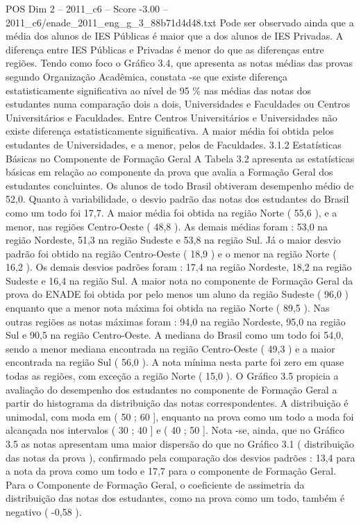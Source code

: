 \begin{textsample}{POS Dim 2 – 2011\_c6 – Score -3.00 – 2011\_c6/enade\_2011\_eng\_g\_3\_88b71d4d48.txt}
Pode ser observado ainda que a média dos alunos de IES Públicas é maior que a dos alunos de IES Privadas.
A diferença entre IES Públicas e Privadas é menor do que as diferenças entre regiões.
Tendo como foco o Gráfico 3.4, que apresenta as notas médias das provas segundo Organização Acadêmica, constata -se que existe diferença estatisticamente significativa ao nível de 95 \% nas médias das notas dos estudantes numa comparação dois a dois, Universidades e Faculdades ou Centros Universitários e Faculdades.
Entre Centros Universitários e Universidades não existe diferença estatisticamente significativa.
A maior média foi obtida pelos estudantes de Universidades, e a menor, pelos de Faculdades. 3.1.2 Estatísticas Básicas no Componente de Formação Geral A Tabela 3.2 apresenta as estatísticas básicas em relação ao componente da prova que avalia a Formação Geral dos estudantes concluintes.
Os alunos de todo Brasil obtiveram desempenho médio de 52,0.
Quanto à variabilidade, o desvio padrão das notas dos estudantes do Brasil como um todo foi 17,7.
A maior média foi obtida na região Norte ( 55,6 ), e a menor, nas regiões Centro-Oeste ( 48,8 ).
As demais médias foram : 53,0 na região Nordeste, 51,3 na região Sudeste e 53,8 na região Sul.
Já o maior desvio padrão foi obtido na região Centro-Oeste ( 18,9 ) e o menor na região Norte ( 16,2 ).
Os demais desvios padrões foram : 17,4 na região Nordeste, 18,2 na região Sudeste e 16,4 na região Sul.
A maior nota no componente de Formação Geral da prova do ENADE foi obtida por pelo menos um aluno da região Sudeste ( 96,0 ) enquanto que a menor nota máxima foi obtida na região Norte ( 89,5 ).
Nas outras regiões as notas máximas foram : 94,0 na região Nordeste, 95,0 na região Sul e 90,5 na região Centro-Oeste.
A mediana do Brasil como um todo foi 54,0, sendo a menor mediana encontrada na região Centro-Oeste ( 49,3 ) e a maior encontrada na região Sul ( 56,0 ).
A nota mínima nesta parte foi zero em quase todas as regiões, com exceção a região Norte ( 15,0 ).
O Gráfico 3.5 propicia a avaliação do desempenho dos estudantes no componente de Formação Geral a partir do histograma da distribuição das notas correspondentes.
A distribuição é unimodal, com moda em ( 50 ; 60 ], enquanto na prova como um todo a moda foi alcançada nos intervalos ( 30 ; 40 ] e ( 40 ; 50 ].
Nota -se, ainda, que no Gráfico 3.5 as notas apresentam uma maior dispersão do que no Gráfico 3.1 ( distribuição das notas da prova ), confirmado pela comparação dos desvios padrões : 13,4 para a nota da prova como um todo e 17,7 para o componente de Formação Geral.
Para o Componente de Formação Geral, o coeficiente de assimetria da distribuição das notas dos estudantes, como na prova como um todo, também é negativo ( -0,58 ).

\end{textsample}
